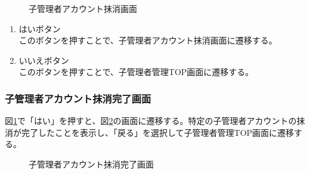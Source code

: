 \documentclass[a4j]{jarticle}
\begin{document}
\begin{figure}[H]
\centering
{}
\caption{子管理者アカウント抹消画面}
\label{fig:delete_admin}
\end{figure}

\begin{enumerate}
  \renewcommand{\labelenumi}{\textcircled{\scriptsize \theenumi}}
\item はいボタン\\
  このボタンを押すことで、子管理者アカウント抹消画面に遷移する。
\item いいえボタン\\
  このボタンを押すことで、子管理者管理TOP画面に遷移する。
\end{enumerate}

\subsubsection{子管理者アカウント抹消完了画面}

図\ref{fig:delete_admin}で「はい」を押すと、図\ref{fig:delete_admin_ok}の画面に遷移する。特定の子管理者アカウントの抹消が完了したことを表示し、「戻る」を選択して子管理者管理TOP画面に遷移する。
\begin{figure}[H]
\centering
{}
\caption{子管理者アカウント抹消完了画面}
\label{fig:delete_admin_ok}
\end{figure}
\end{document}

